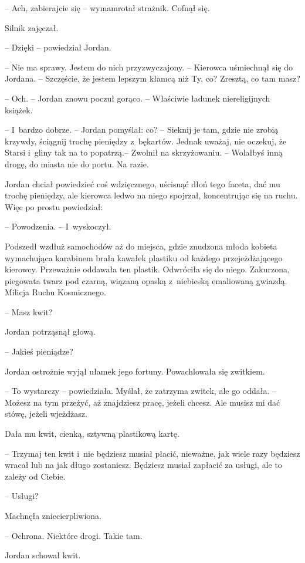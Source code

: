 \documentclass[oneside,polish,11pt,sfheadings]{mwbk}
\begin{document}
-- Ach, zabierajcie się -- wymamrotał strażnik. Cofnął się.

Silnik zajęczał.

-- Dzięki -- powiedział Jordan.

-- Nie ma sprawy. Jestem do nich przyzwyczajony. -- Kierowca uśmiechnął
się do Jordana. -- Szczęście, że jestem lepszym kłamcą niż Ty, co?
Zresztą, co tam masz?

-- Och. -- Jordan znowu poczuł gorąco. -- Właściwie ładunek niereligijnych
książek.

-- I~bardzo dobrze. -- Jordan pomyślał: co? -- Sieknij je tam, gdzie nie
zrobią krzywdy, ściągnij trochę pieniędzy z~bękartów. Jednak uważaj, nie
oczekuj, że Starsi i~gliny tak na to popatrzą.-- Zwolnił na skrzyżowaniu.
-- Wolałbyś inną drogę, do miasta nie do portu. Na razie.

Jordan chciał powiedzieć coś wdzięcznego, uścisnąć dłoń tego faceta, dać
mu trochę pieniędzy, ale kierowca ledwo na niego spojrzał, koncentrując
się na ruchu. Więc po prostu powiedział: 

-- Powodzenia. -- I~wyskoczył.

Podszedł wzdłuż samochodów aż do miejsca, gdzie znudzona młoda kobieta
wymachująca karabinem brała kawałek plastiku od każdego przejeżdżającego
kierowcy. Przeważnie oddawała ten plastik. Odwróciła się do niego.
Zakurzona, piegowata twarz pod czarną, wiązaną opaską z~niebieską
emaliowaną gwiazdą. Milicja Ruchu Kosmicznego.

-- Masz kwit?

Jordan potrząsnął głową.

-- Jakieś pieniądze?

Jordan ostrożnie wyjął ułamek jego fortuny. Powachlowała się zwitkiem.

-- To wystarczy -- powiedziała. Myślał, że zatrzyma zwitek, ale go oddała.
-- Możesz na tym przeżyć, aż znajdziesz pracę, jeżeli chcesz. Ale musisz
mi dać stówę, jeżeli wjeżdżasz.

Dała mu kwit, cienką, sztywną plastikową kartę. 

-- Trzymaj ten kwit i~nie
będziesz musiał płacić, nieważne, jak wiele razy będziesz wracał lub na
jak długo zostaniesz. Będziesz musiał zapłacić za usługi, ale to zależy
od Ciebie.

-- Usługi?

Machnęła zniecierpliwiona. 

-- Ochrona. Niektóre drogi. Takie tam.

Jordan schował kwit. 
\end{document}
